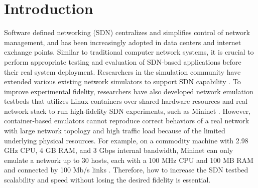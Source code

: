 \section{Introduction}


Software defined networking (SDN) centralizes and simplifies control of network management, and has been increasingly adopted in data centers and internet exchange points\cite{B4, Meridian, SDX}. 
Similar to traditional computer network systems, it is crucial to perform appropriate testing and evaluation of SDN-based applications before their real system deployment.
Researchers in the simulation community have extended various existing network simulators to support SDN capability \cite{S3F, NS3, OPNET}. To improve experimental fidelity, researchers have also developed network emulation testbeds that utilizes Linux containers over shared hardware resources and real network stack to run high-fidelity SDN experiments, such as Mininet \cite{Mininet}. However, container-based emulators cannot reproduce correct behaviors of a real network with large network topology and high traffic load because of the limited underlying physical resources. For example, on a commodity machine with 2.98 GHz CPU, 4 GB RAM, and 3 Gbps internal bandwidth, Mininet can only emulate a network up to 30 hosts, each with a 100 MHz CPU and 100 MB RAM and connected by 100 Mb/s links \cite{ReproNetExprCBE}. Therefore, how to increase the SDN testbed scalability and speed without losing the desired fidelity is essential. 


